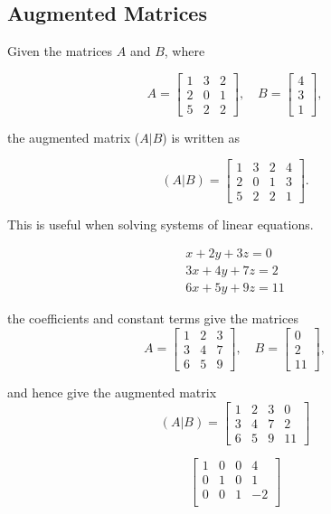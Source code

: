 \documentclass[12pt, a4paper]{article}
\begin{document}
\subsection*{Augmented Matrices}
Given the matrices $A$ and $B$, where

\[
A =
  \begin{bmatrix}
    1 & 3 & 2 \\
    2 & 0 & 1 \\
    5 & 2 & 2
  \end{bmatrix}
, \quad
B =
  \begin{bmatrix}
    4 \\
    3 \\
    1
  \end{bmatrix},
\]

the augmented matrix ($A|B$) is written as

\[
(A|B)=
  \left[\begin{array}{ccc|c}
    1 & 3 & 2 & 4 \\
    2 & 0 & 1 & 3 \\
    5 & 2 & 2 & 1
  \end{array}\right].
\]

This is useful when solving systems of linear equations.


\begin{eqnarray} \nonumber
x + 2y + 3z = 0 \\ \nonumber
3x + 4y + 7z = 2 \\ \nonumber
6x + 5y + 9z = 11 \nonumber
\end{eqnarray}

the coefficients and constant terms give the matrices
\[
A =
\begin{bmatrix}
1 & 2 & 3 \\
3 & 4 & 7 \\
6 & 5 & 9
\end{bmatrix}
, \quad
B =
\begin{bmatrix}
0 \\
2 \\
11
\end{bmatrix},
\]

and hence give the augmented matrix
\[
(A|B) =
  \left[\begin{array}{ccc|c}
1 & 2 & 3 & 0 \\
3 & 4 & 7 & 2 \\
6 & 5 & 9 & 11
  \end{array}\right]
\]

\[\left[\begin{array}{ccc|c}
1 & 0 & 0 & 4 \\
0 & 1 & 0 & 1 \\
0 & 0 & 1 & -2 \\
  \end{array}\right]\]
  
\end{document}
